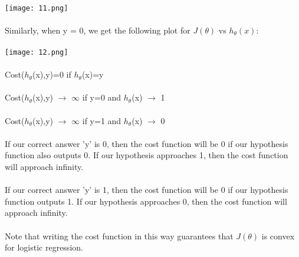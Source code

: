 \documentclass[UTF8]{ctexart}
\begin{document}
\paragraph{}
\texttt{[image: 11.png]}
\newpage
\paragraph{}
Similarly, when y = 0, we get the following plot for $J(θ)$ vs $h_{\theta}(x)$:
\paragraph{}
\texttt{[image: 12.png]}
\paragraph{}
\begin{algorithm}
\paragraph{}
Cost($h_{\theta}$(x),y)=0 \qquad if $h_{\theta}$(x)=y
\paragraph{}
Cost($h_{\theta}$(x),y) $\rightarrow$ $\infty$ \qquad if y=0 and $h_{\theta}$(x) $\rightarrow$ 1
\paragraph{}
Cost($h_{\theta}$(x),y) $\rightarrow$ $\infty$ \qquad if y=1 and $h_{\theta}$(x) $\rightarrow$ 0
\end{algorithm}
\paragraph{}
If our correct answer 'y' is 0, then the cost function will be 0 if our hypothesis function also outputs 0. If our hypothesis approaches 1, then the cost function will approach infinity.
\paragraph{}
If our correct answer 'y' is 1, then the cost function will be 0 if our hypothesis function outputs 1. If our hypothesis approaches 0, then the cost function will approach infinity.
\paragraph{}
Note that writing the cost function in this way guarantees that $J(\theta)$ is convex for logistic regression.
\newpage
\end{document}
